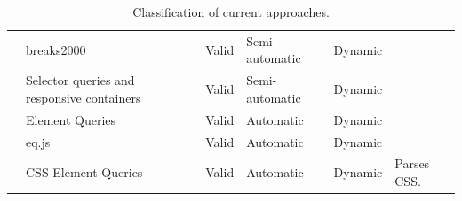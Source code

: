 \documentclass[a4paper,11pt]{kth-mag}
\begin{document}
\begin{table}[ht]
\begin{tabular}[t]{ l p{3cm} l l l p{3cm} }
          \cite{eq_imp_breaks2000} &            breaks2000 &                                  Valid &     Semi-automatic &  Dynamic &   \\
          \cite{eq_imp_selector_queries} &      Selector queries and responsive containers &  Valid &     Semi-automatic &  Dynamic &   \\
          \cite{eq_imp_element-queries} &       Element Queries &                             Valid &     Automatic &       Dynamic &   \\
          \cite{eq_imp_eqjs} &                  eq.js &                                       Valid &     Automatic &       Dynamic &   \\
          \cite{eq_imp_css-element-queries} &   CSS Element Queries &                         Valid &     Automatic &       Dynamic &   Parses CSS. \\
        \end{tabular}
        \caption{Classification of current approaches.}
        \label{table:approaches-classifications}
      \end{table}
      
\end{document}
